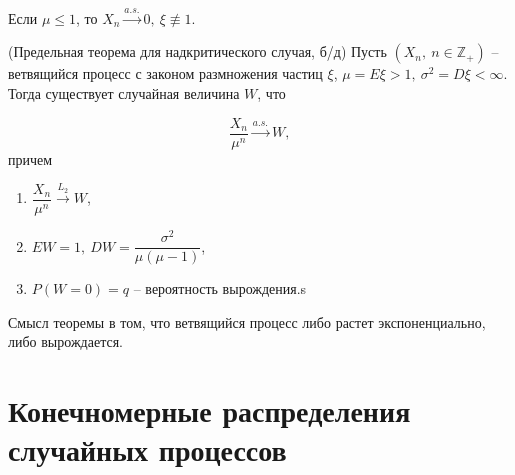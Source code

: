 \begin{corollary}
Если $\displaystyle \mu \leqslant 1$, то $\displaystyle X_{n} \xrightarrow{a.s.} 0,\ \xi \not\equiv 1$.
\end{corollary}
\begin{theorem}
(Предельная теорема для надкритического случая, б/д) Пусть $\displaystyle ( X_{n} ,\ n\in \mathbb{Z}_{+})$ -- ветвящийся процесс с законом размножения частиц $\displaystyle \xi $, $\displaystyle \mu =E\xi  >1,\ \sigma ^{2} =D\xi < \infty $. Тогда существует случайная величина $\displaystyle W$, что


\begin{equation*}
\dfrac{X_{n}}{\mu ^{n}}\xrightarrow{a.s.} W,
\end{equation*}
причем

\begin{enumerate}
    \item $\displaystyle \dfrac{X_{n}}{\mu ^{n}}\xrightarrow{L_{2}} W$,
    \item $\displaystyle EW=1,\ DW=\dfrac{\sigma ^{2}}{\mu ( \mu -1)}$,
    \item $\displaystyle P( W=0) =q$ -- вероятность вырождения.s
\end{enumerate}
\end{theorem}
\begin{note}
Смысл теоремы в том, что ветвящийся процесс либо растет экспоненциально, либо вырождается.
\end{note}
\section{Конечномерные распределения случайных процессов}

